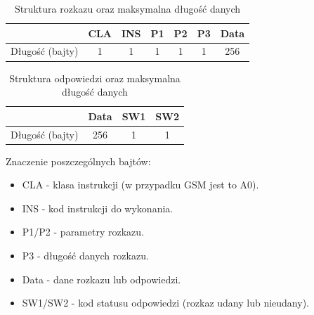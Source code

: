 \documentclass{article}
\begin{document}
\newpage
\begin{table}[ht]
    \centering
    \begin{tabular}{|c|c|c|c|c|c|c|}
         \hline
         & CLA & INS & P1 & P2 & P3 & Data \\
         \hline
         Długość (bajty) & 1 & 1 & 1 & 1 & 1 & 256 \\
         \hline
    \end{tabular}
    \caption{Struktura rozkazu oraz maksymalna długość danych}
\end{table}
\begin{table}[ht]
    \centering
    \begin{tabular}{|c|c|c|c|}
        \hline
        & Data & SW1 & SW2 \\
        \hline
        Długość (bajty) & 256 & 1 & 1 \\
        \hline
    \end{tabular}
    \caption{Struktura odpowiedzi oraz maksymalna długość danych}
\end{table}

Znaczenie poszczególnych bajtów:
\begin{itemize}
    \item CLA - klasa instrukcji (w przypadku GSM jest to A0).
    \item INS - kod instrukcji do wykonania.
    \item P1/P2 - parametry rozkazu.
    \item P3 - długość danych rozkazu.
    \item Data - dane rozkazu lub odpowiedzi.
    \item SW1/SW2 - kod statusu odpowiedzi (rozkaz udany lub nieudany).
\end{itemize}
\end{document}
